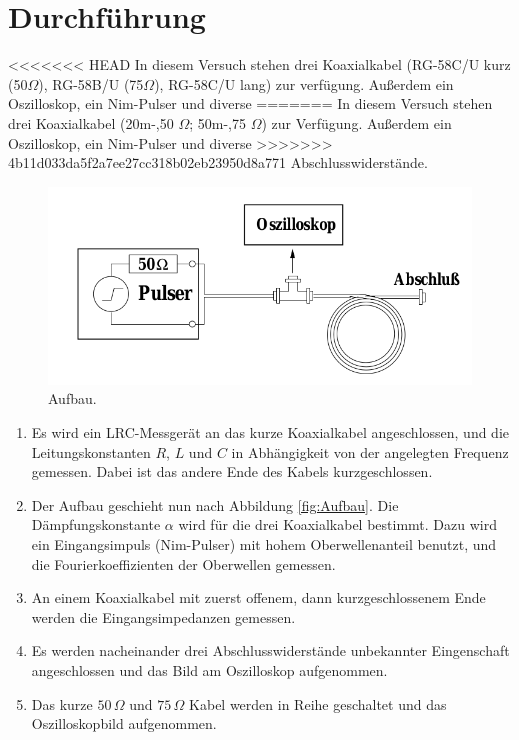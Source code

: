 

\section{Durchführung}
<<<<<<< HEAD
In diesem Versuch stehen drei Koaxialkabel (RG-58C/U kurz (50$\Omega$), RG-58B/U (75$ \Omega$), RG-58C/U lang) 
zur 
verfügung. Außerdem ein Oszilloskop, ein Nim-Pulser und diverse 
=======
In diesem Versuch stehen drei Koaxialkabel (20m-,50 $\Omega$; 50m-,75 $\Omega$)
zur
Verfügung. Außerdem ein Oszilloskop, ein Nim-Pulser und diverse
>>>>>>> 4b11d033da5f2a7ee27cc318b02eb23950d8a771
Abschlusswiderstände.

\begin{figure}[htpb]
  \centering
  \includegraphics[scale=1.0]{bilder/aufbau.png}
  \caption{Aufbau.}
\label{fig:aufbau}
\end{figure}

\begin{enumerate}
\item 	Es wird ein LRC-Messgerät an das kurze Koaxialkabel angeschlossen, und die 
		Leitungskonstanten $R$, $L$ und $C$ in Abhängigkeit von der angelegten 
		Frequenz gemessen. Dabei ist das andere Ende des Kabels kurzgeschlossen.

\item 	Der Aufbau geschieht nun nach Abbildung \ref{fig:Aufbau}.
		Die Dämpfungskonstante $\alpha$ wird für die drei Koaxialkabel bestimmt.
		Dazu wird ein Eingangsimpuls (Nim-Pulser) mit hohem Oberwellenanteil
		benutzt, und die
		Fourierkoeffizienten der Oberwellen gemessen.

\item 	An einem Koaxialkabel mit zuerst offenem, dann kurzgeschlossenem Ende
		werden die Eingangsimpedanzen gemessen.

\item	Es werden
		nacheinander drei Abschlusswiderstände unbekannter Eingenschaft
		angeschlossen und das Bild am Oszilloskop aufgenommen.

\item	Das kurze $50 \,\Omega$ und $75 \, \Omega$ Kabel werden in Reihe geschaltet und 
		das	Oszilloskopbild aufgenommen.


\end{enumerate}


